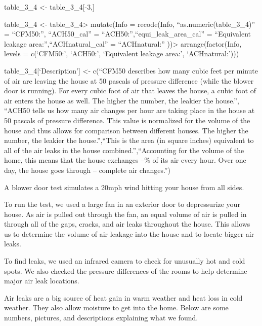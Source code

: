 \documentclass[
  letterpaper,
  DIV=11,
  numbers=noendperiod]{scrartcl}
\begin{document}
table\_3\_4 \textless- table\_3\_4{[}-3,{]}

table\_3\_4 \textless- table\_3\_4\textbar\textgreater{} mutate(Info =
recode(Info, ``as.numeric(table\_3\_4)'' = ``CFM50:'', ``ACH50\_cal'' =
``ACH50:'',``equi\_leak\_area\_cal'' = ``Equivalent leakage
area:'',``ACHnatural\_cal'' = ``ACHnatural:'' ))\textbar\textgreater{}
arrange(factor(Info, levels = c(`CFM50:', `ACH50:', `Equivalent leakage
area:', `ACHnatural:')))

table\_3\_4{[}`Description'{]} \textless- c(``CFM50 describes how many
cubic feet per minute of air are leaving the house at 50 pascals of
pressure difference (while the blower door is running). For every cubic
foot of air that leaves the house, a cubic foot of air enters the house
as well. The higher the number, the leakier the house.'', ``ACH50 tells
us how many air changes per hour are taking place in the house at 50
pascals of pressure difference. This value is normalized for the volume
of the house and thus allows for comparison between different houses.
The higher the number, the leakier the house.'',``This is the area (in
square inches) equivalent to all of the air leaks in the house
combined.'',``Accounting for the volume of the home, this means that the
house exchanges --\% of its air every hour. Over one day, the house goes
through -- complete air changes.'')

A blower door test simulates a 20mph wind hitting your house from all
sides.

To run the test, we used a large fan in an exterior door to depressurize
your house. As air is pulled out through the fan, an equal volume of air
is pulled in through all of the gaps, cracks, and air leaks throughout
the house. This allows us to determine the volume of air leakage into
the house and to locate bigger air leaks.

To find leaks, we used an infrared camera to check for unusually hot and
cold spots. We also checked the pressure differences of the rooms to
help determine major air leak locations.

Air leaks are a big source of heat gain in warm weather and heat loss in
cold weather. They also allow moisture to get into the home. Below are
some numbers, pictures, and descriptions explaining what we found.
\end{document}
